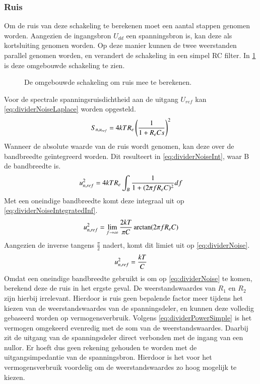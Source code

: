 \subsubsection{Ruis}
Om de ruis van deze schakeling te berekenen moet een aantal stappen genomen worden. Aangezien de ingangsbron $U_{dd}$ een spanningsbron is, kan deze als kortsluiting genomen worden. Op deze manier kunnen de twee weerstanden parallel genomen worden, en verandert de schakeling in een simpel RC filter. In \cref{fig:dividerNoise} is deze omgebouwde schakeling te zien.

\begin{figure}[!htbp]
    \centering
    \def\svgwidth{0.35\textwidth}
    
    \caption{De omgebouwde schakeling om ruis mee te berekenen.}
    \label{fig:dividerNoise}
\end{figure}

\noindent
Voor de spectrale spanningsruisdichtheid aan de uitgang $U_{ref}$ kan \cref{eq:dividerNoiseLaplace} worden opgesteld.
\begin{equation}\label{eq:dividerNoiseLaplace}
    S_{n,u_{ref}} = 4kTR_e\left(\frac{1}{1 + R_eCs}\right)^2
    \tagaddtext{[\si{\volt\squared\per\hertz}]}
\end{equation}
Wanneer de absolute waarde van de ruis wordt genomen, kan deze over de bandbreedte geïntegreerd worden. Dit resulteert in \cref{eq:dividerNoiseInt}, waar B de bandbreedte is.
\begin{equation}\label{eq:dividerNoiseInt}
    u_{n,ref}^2 = 4kTR_e\int_{B} \frac{1}{1 + (2\pi f R_e C)^2} df
    \tagaddtext{[\si{\volt\squared}]}
\end{equation}
Met een oneindige bandbreedte komt deze integraal uit op \cref{eq:dividerNoiseIntegratedInf}.
\begin{equation}\label{eq:dividerNoiseIntegratedInf}
    u_{n,ref}^2 = \lim_{f\rightarrow\infty}\frac{2kT}{\pi C} \arctan(2\pi f R_eC)
    \tagaddtext{[\si{\volt\squared}]}
\end{equation}
Aangezien de inverse tangens $\frac{\pi}{2}$ nadert, komt dit limiet uit op \cref{eq:dividerNoise}.
\begin{equation}\label{eq:dividerNoise}
    u_{n,ref}^2 = \frac{kT}{C}
    \tagaddtext{[\si{\volt\squared}]}
\end{equation}
Omdat een oneindige bandbreedte gebruikt is om op \cref{eq:dividerNoise} te komen, berekend deze de ruis in het ergste geval. De weerstandswaardes van $R_1$ en $R_2$ zijn hierbij irrelevant. Hierdoor is ruis geen bepalende factor meer tijdens het kiezen van de weerstandswaardes van de spanningsdeler, en kunnen deze volledig gebaseerd worden op vermogensverbruik. Volgens \cref{eq:dividerPowerSimple} is het vermogen omgekeerd evenredig met de som van de weerstandswaardes. Daarbij zit de uitgang van de spanningsdeler direct verbonden met de ingang van een nullor. Er hoeft dus geen rekening gehouden te worden met de uitgangsimpedantie van de spanningsbron. Hierdoor is het voor het vermogensverbruik voordelig om de weerstandswaardes zo hoog mogelijk te kiezen.
